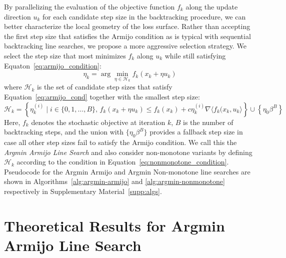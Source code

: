 \documentclass[10pt]{article} %
\newcommand{\xAt}[1]{x_{#1}}
\newcommand{\update}{u}
\newcommand{\updateAt}[1]{\update_{#1}}
\newcommand{\stepSize}{\eta}
\newcommand{\stepSizeInit}{\eta_0}
\newcommand{\stepSizeAt}[1]{\stepSize_{#1}}
\newcommand{\inner}[2]{\langle #1, #2 \rangle}
\begin{document}
By parallelizing the evaluation of the objective function $f_k$ along the update direction $\updateAt{k}$ for each candidate step size in the backtracking procedure, we can better characterize the local geometry of the loss surface. Rather than accepting the first step size that satisfies the Armijo condition as is typical with sequential backtracking line searches, we propose a more aggressive selection strategy. We select the step size that most minimizes $f_k$ along $\updateAt{k}$ while still satisfying Equaton~\ref{eq:armijo_condition}:
%
\begin{equation}
    \stepSizeAt{k} = \arg\min_{\stepSize \in \mathcal{H}_k} f_k(\xAt{k} + \eta \updateAt{k})
\end{equation}
%
where $\mathcal{H}_k$ is the set of candidate step sizes that satisfy Equation~\ref{eq:armijo_cond} together with the smallest step size:
%
\begin{equation} 
    \mathcal{H}_k = \left\{ \stepSizeAt{k}^{(i)} \mid i \in \{0, 1, \dots, B\}, \, f_k(\xAt{k} + \eta \updateAt{k}) \leq f_k(\xAt{k}) + c \stepSizeAt{k}^{(i)} \nabla \inner{f_k(\xAt{k}}{ \updateAt{k}} \right\} \cup \left\{ \stepSizeInit \beta^B \right\}
    \label{eq:min_search}
\end{equation}
%
Here, $f_k$ denotes the stochastic objective at iteration $k$, $B$ is the number of backtracking steps, and the union with $\{\stepSizeInit \beta^B\}$ provides a fallback step size in case all other step sizes fail to satisfy the Armijo condition. We call this the \textit{Argmin Armijo Line Search} and also consider non-monotone variants by defining $\mathcal{H}_k$ according to the condition in Equation~\ref{eq:nonmonotone_condition}. Pseudocode for the Argmin Armijo and Argmin Non-monotone line searches are shown in Algorithms~\ref{alg:argmin-armijo} and \ref{alg:argmin-nonmonotone} respectively in Supplementary Material~\ref{supp:algs}.

\section{Theoretical Results for Argmin Armijo Line Search} \label{sec:theory}
\end{document}
